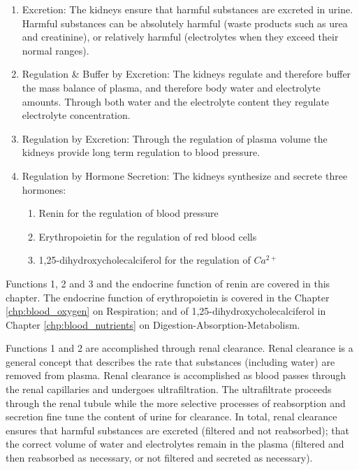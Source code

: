 \begin{enumerate}
    \item Excretion: The kidneys ensure that harmful substances are excreted in urine. Harmful substances can be absolutely harmful (waste products such as urea and creatinine), or relatively harmful (electrolytes when they exceed their normal ranges).
    \item Regulation \& Buffer by Excretion: The kidneys regulate and therefore buffer the mass balance of plasma, and therefore body water and electrolyte amounts. Through both water and the electrolyte content they regulate electrolyte concentration.
    \item Regulation by Excretion: Through the regulation of plasma volume the kidneys provide long term regulation to blood pressure.
    \item Regulation by Hormone Secretion: The kidneys synthesize and secrete three hormones:
    \begin{enumerate}
        \item Renin for the regulation of blood pressure
        \item Erythropoietin for the regulation of red blood cells
        \item 1,25-dihydroxycholecalciferol for the regulation of $Ca^{2+}$
    \end{enumerate}
\end{enumerate}

Functions 1, 2 and 3 and the endocrine function of renin are covered in this chapter. The endocrine function of erythropoietin is covered in the Chapter \ref{chp:blood_oxygen} on Respiration; and of 1,25-dihydroxycholecalciferol in Chapter \ref{chp:blood_nutrients} on Digestion-Absorption-Metabolism.

Functions 1 and 2 are accomplished through renal clearance. Renal clearance is a general concept that describes the rate that substances (including water) are removed from plasma. Renal clearance is accomplished as blood passes through the renal capillaries and undergoes ultrafiltration. The ultrafiltrate proceeds through the renal tubule while the more selective processes of reabsorption and secretion fine tune the content of urine for clearance. In total, renal clearance ensures that harmful substances are excreted (filtered and not reabsorbed); that the correct volume of water and electrolytes remain in the plasma (filtered and then reabsorbed as necessary, or not filtered and secreted as necessary). 

